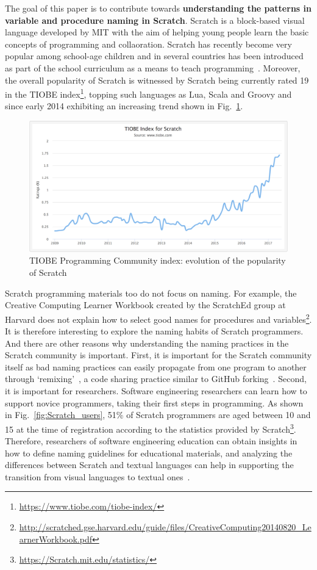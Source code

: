 \documentclass[conference]{IEEEtran}
\begin{document}
The goal of this paper is to contribute towards \textbf{understanding the patterns in variable and procedure naming in Scratch}. Scratch is a block-based visual language developed by MIT with the aim of helping young people learn the basic concepts of programming and collaoration. 
Scratch has recently become very popular among school-age children and in several countries has been introduced as part of the school curriculum as a means to teach programming~\cite{vanZyl,SaezLopez}.
Moreover, the overall popularity of Scratch is witnessed by Scratch being currently rated 19 in the TIOBE index\footnote{\url{https://www.tiobe.com/tiobe-index/}}, topping such languages as Lua, Scala and Groovy and since early 2014 exhibiting an increasing trend shown in Fig.~\ref{fig:tiobe}.
\begin{figure}[tb]
  \begin{center}
  \includegraphics[scale=0.25]{fig/tiobe}
  \caption{TIOBE Programming Community index: evolution of the popularity of Scratch}
  \label{fig:tiobe}
  \end{center}
\end{figure} 

Scratch programming materials too do not focus on naming. For example, the Creative Computing Learner Workbook created by the ScratchEd group at Harvard does not explain how to select good names for procedures and variables\footnote{\url{http://scratched.gse.harvard.edu/guide/files/CreativeComputing20140820_LearnerWorkbook.pdf}}. It is therefore interesting to explore the naming habits of Scratch programmers. And there are other reasons why understanding the naming practices in the Scratch community is important. First, it is important for the Scratch community itself as bad naming practices can easily propagate from one program to another through `remixing'~\cite{Hill:Monroy-Hernandez,Davis:Kafai:Vasudevan:Lee}, a code sharing practice similar to GitHub forking~\cite{RastogiN16}.
Second, it is important for researchers. Software engineering researchers can learn how to support novice programmers, taking their first steps in programming. As shown in Fig.~\ref{fig:Scratch_users}, 51\% of Scratch programmers are aged between 10 and 15 at the time of registration according to the statistics provided by Scratch\footnote{\url{https://Scratch.mit.edu/statistics/}}. Therefore, researchers of software engineering education can obtain insights in how to define naming guidelines for educational materials, and analyzing the differences between Scratch and textual languages can help in supporting the transition from visual languages to textual ones~\cite{Dann,Matsuzawa}. 
\end{document}
